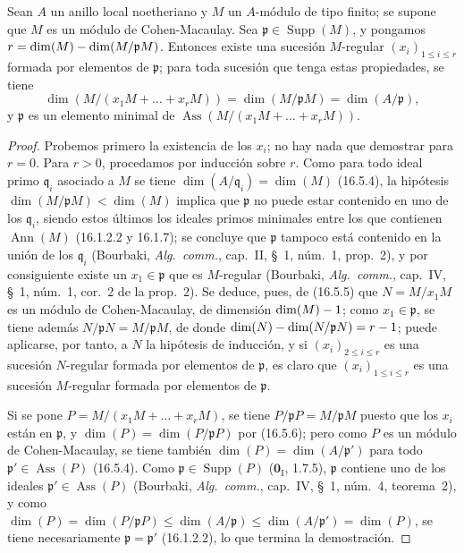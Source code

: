 \begin{proposition}[16.5.9]
\label{0.16.5.9-fr}
Sean $A$ un anillo local noetheriano y $M$ un $A$-módulo de tipo finito; se
supone que $M$ es un módulo de Cohen-Macaulay. Sea
$\mathfrak{p}\in\operatorname{Supp}(M)$, y pongamos
$r=\dim(M)-\dim(M/\mathfrak{p}M)$. Entonces existe una sucesión $M$-regular
$(x_i)_{1\leq i\leq r}$ formada por elementos de $\mathfrak{p}$; para toda
sucesión que tenga estas propiedades, se tiene
\[
  \dim(M/(x_1M+\ldots+x_rM))
  =\dim(M/\mathfrak{p}M)=\dim(A/\mathfrak{p}),
\]
y $\mathfrak{p}$ es un elemento minimal de
$\operatorname{Ass}(M/(x_1M+\ldots+x_rM))$.
\end{proposition}

\begin{proof}
Probemos primero la existencia de los $x_i$; no hay nada que demostrar para
$r=0$. Para $r>0$, procedamos por inducción sobre $r$. Como para todo ideal
primo $\mathfrak{q}_i$ asociado a $M$ se tiene
$\dim(A/\mathfrak{q}_i)=\dim(M)$ (16.5.4), la hipótesis
$\dim(M/\mathfrak{p}M)<\dim(M)$ implica que $\mathfrak{p}$ no puede estar
contenido en uno de los $\mathfrak{q}_i$, siendo estos últimos los ideales primos
minimales entre los que contienen $\operatorname{Ann}(M)$ (16.1.2.2 y
16.1.7); se concluye que $\mathfrak{p}$ tampoco está contenido en la
unión de los $\mathfrak{q}_i$ (Bourbaki, \emph{Alg.~comm.}, cap.~II, \S~1,
núm.~1, prop.~2), y por consiguiente existe un $x_1\in\mathfrak{p}$ que es
$M$-regular (Bourbaki, \emph{Alg.~comm.}, cap.~IV, \S~1, núm.~1, cor.~2 de
la prop.~2). Se deduce, pues, de (16.5.5) que $N=M/x_1M$ es un módulo de
Cohen-Macaulay, de dimensión $\dim(M)- 1$; como $x_1\in\mathfrak{p}$, se tiene
además $N/\mathfrak{p}N=M/\mathfrak{p}M$, de donde
$\dim(N)-\dim(N/\mathfrak{p}N)=r- 1$; puede aplicarse, por tanto, a $N$
la hipótesis de inducción, y si $(x_i)_{2\leq i\leq r}$ es una sucesión
$N$-regular formada por elementos de $\mathfrak{p}$, es claro que
$(x_i)_{1\leq i\leq r}$ es una sucesión $M$-regular formada por elementos de
$\mathfrak{p}$.

Si se pone $P=M/(x_1M+\ldots+x_rM)$, se tiene
$P/\mathfrak{p}P=M/\mathfrak{p}M$ puesto que los $x_i$ están en
$\mathfrak{p}$, y $\dim(P)=\dim(P/\mathfrak{p}P)$ por (16.5.6); pero como
$P$ es un módulo de Cohen-Macaulay, se tiene también
$\dim(P)=\dim(A/\mathfrak{p}')$ para todo
$\mathfrak{p}'\in\operatorname{Ass}(P)$ (16.5.4). Como
$\mathfrak{p}\in\operatorname{Supp}(P)$ ($\mathbf{0}_{\mathrm I}$, 1.7.5),
$\mathfrak{p}$ contiene uno de los ideales
$\mathfrak{p}'\in\operatorname{Ass}(P)$ (Bourbaki, \emph{Alg.~comm.},
cap.~IV, \S~1, núm.~4, teorema~2), y como
$\dim(P)=\dim(P/\mathfrak{p}P)
\leq\dim(A/\mathfrak{p})
\leq\dim(A/\mathfrak{p}')=\dim(P)$,
se tiene necesariamente $\mathfrak{p}=\mathfrak{p}'$ (16.1.2.2), lo que
termina la demostración.
\end{proof}


